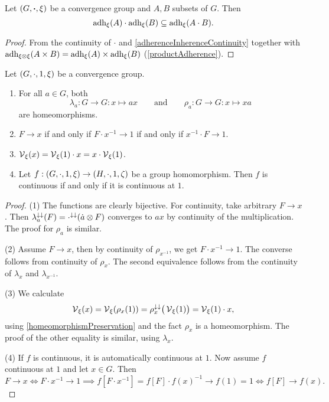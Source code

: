 \begin{lemma} \label{closureGroupOperation}
Let $\left( G, \boldsymbol{\cdot}, \xi \right)$ be a convergence group and $A,B$ subsets of $G$. Then
\[ \operatorname{adh}_\xi(A)\cdot \operatorname{adh}_\xi(B) \subseteq \operatorname{adh}_\xi(A\cdot B). \]
\end{lemma}
\begin{proof}
From the continuity of $\cdot$ and \ref{adherenceInherenceContinuity} together with $\operatorname{adh}_{\xi\otimes\xi}(A\times B) = \operatorname{adh}_\xi(A)\times \operatorname{adh}_\xi(B)$ (\ref{productAdherence}).
\end{proof}

\begin{lemma} \label{shiftHomeomorphism}
Let $\left( G,\cdot, 1, \xi \right)$ be a convergence group.
\begin{enumerate}
\item For all $a\in G$, both
\[ \lambda_a: G\to G: x\mapsto ax \qquad\text{and}\qquad \rho_a: G\to G: x\mapsto xa \]
are homeomorphisms.
\item $F \to x$ \textup{if and only if} $F\cdot x^{-1} \to 1$ \textup{if and only if} $x^{-1}\cdot F\to 1$.
\item $\operatorname{\mathcal{V}}_\xi(x) = \operatorname{\mathcal{V}}_\xi(1) \cdot x = x\cdot \operatorname{\mathcal{V}}_\xi(1)$.
\item Let $f: \left( G,\cdot, 1, \xi \right) \to \left( H,\cdot, 1, \zeta \right)$ be a group homomorphism. Then $f$ is continuous \textup{if and only if} it is continuous at $1$.
\end{enumerate}
\end{lemma}
\begin{proof}
(1) The functions are clearly bijective. For continuity, take arbitrary $F\to x$. Then $\lambda_a^{\downarrow\downarrow}(F) = \cdot^{\downarrow\downarrow}(\dot{a}\otimes F)$ converges to $ax$ by continuity of the multiplication. The proof for $\rho_a$ is similar.

(2) Assume $F\to x$, then by continuity of $\rho_{x^{-1}}$, we get $F\cdot x^{-1} \to 1$. The converse follows from continuity of $\rho_x$. The second equivalence follows from the continuity of $\lambda_{x}$ and $\lambda_{x^{-1}}$.

(3) We calculate
\[ \operatorname{\mathcal{V}}_\xi(x) = \operatorname{\mathcal{V}}_\xi(\rho_x(1)) = \rho_x^{\downarrow\downarrow}\big(\operatorname{\mathcal{V}}_\xi(1)\big) = \operatorname{\mathcal{V}}_\xi(1) \cdot x, \]
using \ref{homeomorphismPreservation} and the fact $\rho_x$ is a homeomorphism. The proof of the other equality is similar, using $\lambda_x$.

(4) If $f$ is continuous, it is automatically continuous at $1$. Now assume $f$ continuous at $1$ and let $x\in G$. Then
\[ F\to x \iff F\cdot x^{-1} \to 1 \implies f[F\cdot x^{-1}] = f[F]\cdot f(x)^{-1} \to f(1) = 1 \iff f[F] \to f(x). \]
\end{proof}

